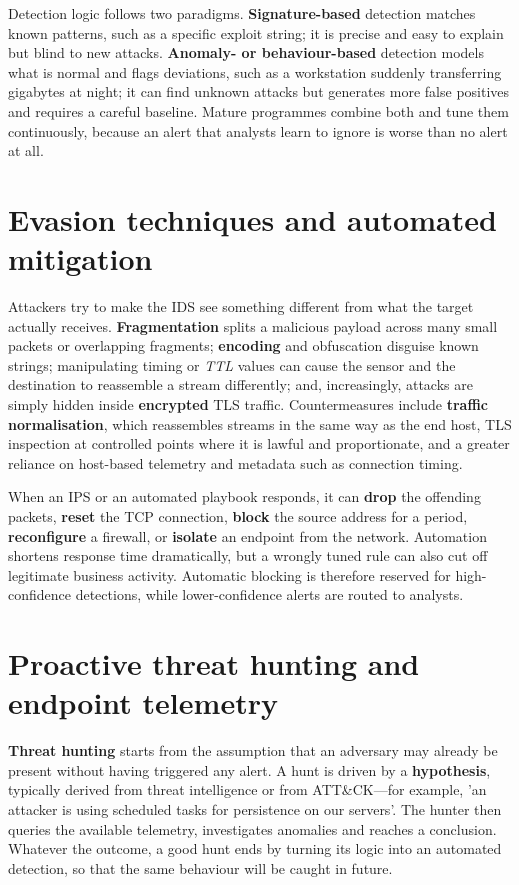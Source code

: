 \documentclass[11pt,openany]{book}
\begin{document}
Detection logic follows two paradigms. \textbf{Signature-based} detection matches known patterns, such as a specific exploit string; it is precise and easy to explain but blind to new attacks. \textbf{Anomaly- or behaviour-based} detection models what is normal and flags deviations, such as a workstation suddenly transferring gigabytes at night; it can find unknown attacks but generates more false positives and requires a careful baseline. Mature programmes combine both and tune them continuously, because an alert that analysts learn to ignore is worse than no alert at all.

\section{Evasion techniques and automated mitigation}\label{sec:11.2}
Attackers try to make the IDS see something different from what the target actually receives. \textbf{Fragmentation} splits a malicious payload across many small packets or overlapping fragments; \textbf{encoding} and obfuscation disguise known strings; manipulating timing or \emph{TTL} values can cause the sensor and the destination to reassemble a stream differently; and, increasingly, attacks are simply hidden inside \textbf{encrypted} TLS traffic. Countermeasures include \textbf{traffic normalisation}, which reassembles streams in the same way as the end host, TLS inspection at controlled points where it is lawful and proportionate, and a greater reliance on host-based telemetry and metadata such as connection timing.

When an IPS or an automated playbook responds, it can \textbf{drop} the offending packets, \textbf{reset} the TCP connection, \textbf{block} the source address for a period, \textbf{reconfigure} a firewall, or \textbf{isolate} an endpoint from the network. Automation shortens response time dramatically, but a wrongly tuned rule can also cut off legitimate business activity. Automatic blocking is therefore reserved for high-confidence detections, while lower-confidence alerts are routed to analysts.

\section{Proactive threat hunting and endpoint telemetry}\label{sec:11.3}
\textbf{Threat hunting} starts from the assumption that an adversary may already be present without having triggered any alert. A hunt is driven by a \textbf{hypothesis}, typically derived from threat intelligence or from ATT\&CK—for example, 'an attacker is using scheduled tasks for persistence on our servers'. The hunter then queries the available telemetry, investigates anomalies and reaches a conclusion. Whatever the outcome, a good hunt ends by turning its logic into an automated detection, so that the same behaviour will be caught in future.
\end{document}
